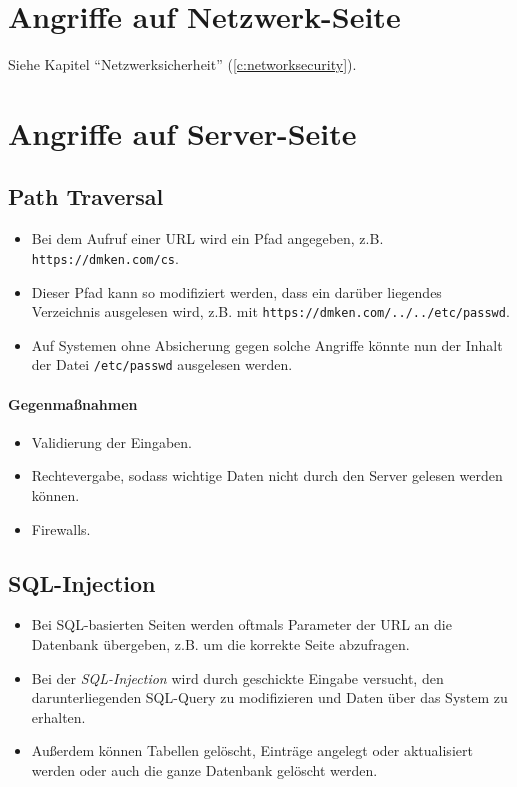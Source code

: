 	\section{Angriffe auf Netzwerk-Seite}
		Siehe Kapitel \enquote{Netzwerksicherheit} (\ref{c:networksecurity}).
	
	\section{Angriffe auf Server-Seite}
		\subsection{Path Traversal}
			\begin{itemize}
				\item Bei dem Aufruf einer URL wird ein Pfad angegeben, z.B. \texttt{https://dmken.com/cs}.
				\item Dieser Pfad kann so modifiziert werden, dass ein darüber liegendes Verzeichnis ausgelesen wird, z.B. mit \texttt{https://dmken.com/../../etc/passwd}.
				\item Auf Systemen ohne Absicherung gegen solche Angriffe könnte nun der Inhalt der Datei \texttt{/etc/passwd} ausgelesen werden.
			\end{itemize}
			
			\paragraph{Gegenmaßnahmen}
				\begin{itemize}
					\item Validierung der Eingaben.
					\item Rechtevergabe, sodass wichtige Daten nicht durch den Server gelesen werden können.
					\item Firewalls.
				\end{itemize}
		
		\subsection{SQL-Injection}
			\begin{itemize}
				\item Bei SQL-basierten Seiten werden oftmals Parameter der URL an die Datenbank übergeben, z.B. um die korrekte Seite abzufragen.
				\item Bei der \textit{SQL-Injection} wird durch geschickte Eingabe versucht, den darunterliegenden SQL-Query zu modifizieren und Daten über das System zu erhalten.
				\item Außerdem können Tabellen gelöscht, Einträge angelegt oder aktualisiert werden oder auch die ganze Datenbank gelöscht werden.
			\end{itemize}
		
